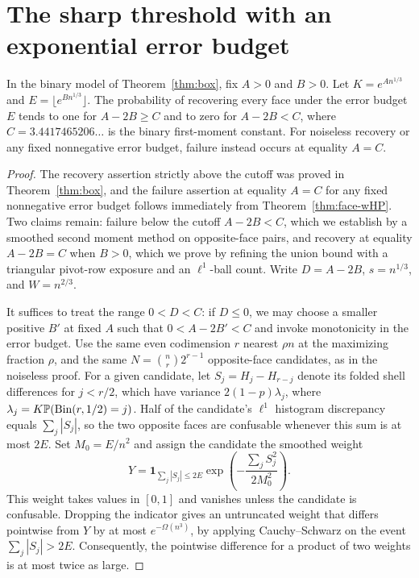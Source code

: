 \section{The sharp threshold with an exponential error budget}\label{sec:noisy-face-proof}
\begin{theorem}\label{thm:noisy-face}
In the binary model of Theorem~\ref{thm:box}, fix \(A>0\) and \(B>0\).
Let \(K=e^{An^{1/3}}\) and \(E=\lfloor e^{Bn^{1/3}}\rfloor\).
The probability of recovering every face under the error budget \(E\)
tends to one for \(A-2B\ge C\) and to zero for \(A-2B<C\), where
\(C=3.4417465206\ldots\) is the binary first-moment constant.
For noiseless recovery or any fixed nonnegative error budget, failure
instead occurs at equality \(A=C\).
\end{theorem}

\begin{proof}
The recovery assertion strictly above the cutoff was proved in Theorem~\ref{thm:box}, and the failure assertion at equality \(A=C\) for any fixed nonnegative error budget follows immediately from Theorem~\ref{thm:face-wHP}. Two claims remain: failure below the cutoff \(A-2B<C\), which we establish by a smoothed second moment method on opposite-face pairs, and recovery at equality \(A-2B=C\) when \(B>0\), which we prove by refining the union bound with a triangular pivot-row exposure and an \(\ell^1\)-ball count. Write \(D=A-2B\), \(s=n^{1/3}\), and \(W=n^{2/3}\).

It suffices to treat the range \(0<D<C\): if \(D\le0\), we may choose a smaller positive \(B'\) at fixed \(A\) such that \(0<A-2B'<C\) and invoke monotonicity in the error budget. Use the same even codimension \(r\) nearest \(\rho n\) at the maximizing fraction \(\rho\), and the same \(N=\binom nr2^{r-1}\) opposite-face candidates, as in the noiseless proof. For a given candidate, let \(S_j=H_j-H_{r-j}\) denote its folded shell differences for \(j<r/2\), which have variance \(2(1-p)\lambda_j\), where \(\lambda_j=K\mathbb P(\operatorname{Bin}(r,1/2)=j)\). Half of the candidate's \(\ell^1\) histogram discrepancy equals \(\sum_j|S_j|\), so the two opposite faces are confusable whenever this sum is at most \(2E\). Set \(M_0=E/n^2\) and assign the candidate the smoothed weight
\[
 Y=\mathbf1_{\sum_j|S_j|\le2E}
       \exp\left(-\frac{\sum_j S_j^2}{2M_0^2}\right).
\]
This weight takes values in \([0,1]\) and vanishes unless the candidate is confusable. Dropping the indicator gives an untruncated weight that differs pointwise from \(Y\) by at most \(e^{-\Omega(n^3)}\), by applying Cauchy--Schwarz on the event \(\sum_j|S_j|>2E\). Consequently, the pointwise difference for a product of two weights is at most twice as large.


\end{proof}
